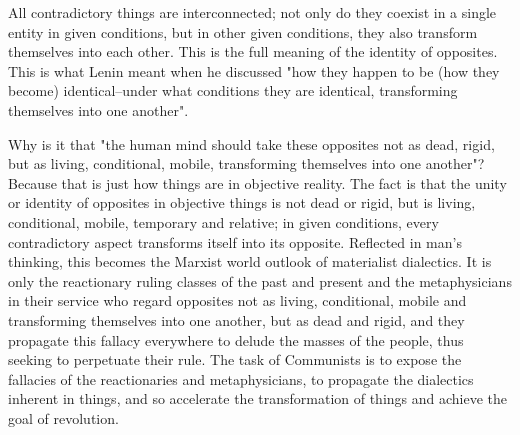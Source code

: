 \documentclass{article}
\begin{document}
All contradictory things are interconnected; not only do they coexist in
a single entity in given conditions, but in other given conditions, they also
transform themselves into each other. This is the full meaning of the identity
of opposites. This is what Lenin meant when he discussed "how they happen to be
(how they become) identical--under what conditions they are identical,
transforming themselves into one another".

Why is it that "the human mind should take these opposites not as dead, rigid,
but as living, conditional, mobile, transforming themselves into one another"?
Because that is just how things are in objective reality. The fact is that the
unity or identity of opposites in objective things is not dead or rigid, but is
living, conditional, mobile, temporary and relative; in given conditions, every
contradictory aspect transforms itself into its opposite. Reflected in man's
thinking, this becomes the Marxist world outlook of materialist dialectics. It
is only the reactionary ruling classes of the past and present and the
metaphysicians in their service who regard opposites not as living,
conditional, mobile and transforming themselves into one another, but as dead
and rigid, and they propagate this fallacy everywhere to delude the masses of
the people, thus seeking to perpetuate their rule. The task of Communists is to
expose the fallacies of the reactionaries and metaphysicians, to propagate the
dialectics inherent in things, and so accelerate the transformation of things
and achieve the goal of revolution.
\end{document}
